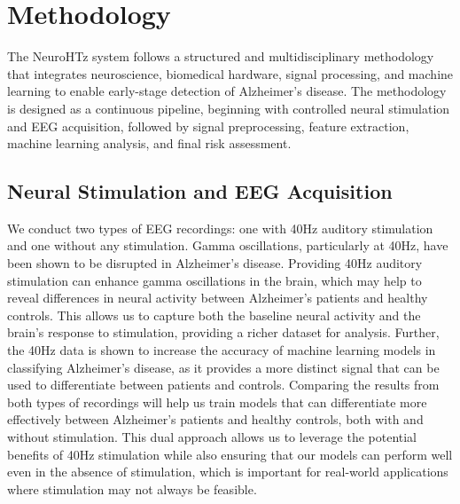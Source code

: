 \documentclass[openany]{book}
\begin{document}
\section{Methodology}
The NeuroHTz system follows a structured and multidisciplinary methodology that integrates neuroscience, biomedical hardware, signal processing, and machine learning to enable early-stage detection of Alzheimer's disease. The methodology is designed as a continuous pipeline, beginning with controlled neural stimulation and EEG acquisition, followed by signal preprocessing, feature extraction, machine learning analysis, and final risk assessment. \\
\subsection{Neural Stimulation and EEG Acquisition}
We conduct two types of EEG recordings: one with 40Hz auditory stimulation and one without any stimulation. Gamma oscillations, particularly at 40Hz, have been shown to be disrupted in Alzheimer's disease. Providing 40Hz auditory stimulation can enhance gamma oscillations in the brain, which may help to reveal differences in neural activity between Alzheimer's patients and healthy controls. This allows us to capture both the baseline neural activity and the brain's response to stimulation, providing a richer dataset for analysis. Further, the 40Hz data is shown to increase the accuracy of machine learning models in classifying Alzheimer's disease, as it provides a more distinct signal that can be used to differentiate between patients and controls. Comparing the results from both types of recordings will help us train models that can differentiate more effectively between Alzheimer's patients and healthy controls, both with and without stimulation. This dual approach allows us to leverage the potential benefits of 40Hz stimulation while also ensuring that our models can perform well even in the absence of stimulation, which is important for real-world applications where stimulation may not always be feasible. \\
\end{document}
